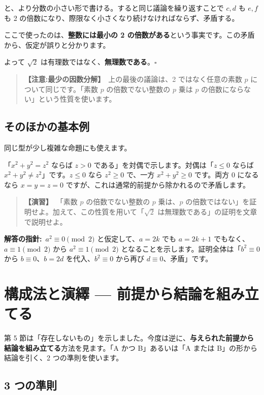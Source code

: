 \documentclass{article}
\begin{document}
と、より分数の小さい形で書ける。すると同じ議論を繰り返すことで \(c, d\) も \(e, f\) も 2 の倍数になり、際限なく小さくなり続けなければならず、矛盾する。

ここで使ったのは、\textbf{整数には最小の 2 の倍数がある}という事実です。この矛盾から、仮定が誤りと分かります。

よって \(\sqrt{2}\) は有理数ではなく、\textbf{無理数である}。\(\square\)

\begin{quote}
\textbf{【注意:最少の因数分解】}\ 上の最後の議論は、2 ではなく任意の素数 \(p\) について同じです。「素数 \(p\) の倍数でない整数の \(p\) 乗は \(p\) の倍数にならない」という性質を使います。
\end{quote}

\subsection{そのほかの基本例}

同じ型が少し複雑な命題にも使えます。

「\(x^2 + y^2 = z^2\) ならば \(z > 0\) である」を対偶で示します。対偶は「\(z \le 0\) ならば \(x^2 + y^2 \neq z^2\)」です。\(z \le 0\) なら \(z^2 \ge 0\) で、一方 \(x^2 + y^2 \ge 0\) です。両方 0 になるなら \(x = y = z = 0\) ですが、これは通常的前提から除かれるので矛盾します。

\begin{quote}
\textbf{【演習】}\ 「素数 \(p\) の倍数でない整数の \(p\) 乗は、\(p\) の倍数ではない」を証明せよ。加えて、この性質を用いて「\(\sqrt{2}\) は無理数である」の証明を文章で説明せよ。
\end{quote}

\textbf{解答の指針:}\ \(a^2 \equiv 0 \pmod{2}\) と仮定して、\(a = 2k\) でも \(a = 2k+1\) でもなく、\(a \equiv 1 \pmod{2}\) から \(a^2 \equiv 1 \pmod{2}\) となることを示します。証明全体は「\(b^2 \equiv 0\) から \(b \equiv 0\)、\(b = 2d\) を代入、\(b^2 \equiv 0\) から再び \(d \equiv 0\)、矛盾」です。

\section{構成法と演繹 — 前提から結論を組み立てる}

第 5 節は「存在しないもの」を示しました。今度は逆に、\textbf{与えられた前提から結論を組み立てる}方法を見ます。「A かつ B」あるいは「A または B」の形から結論を引く、2 つの準則を使います。

\subsection{3 つの準則}
\end{document}
